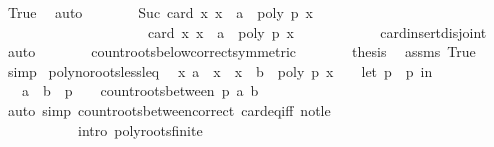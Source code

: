 \begin{isabellebody}
\ True\ \isamarkupfalse%
\ auto\isanewline
\ \ \ \ \isamarkupfalse%
\ \isamarkupfalse%
\ {\isachardoublequoteopen}Suc\ {\isacharparenleft}card\ {\isacharbraceleft}x{\isachardot}\ x\ {\isacharless}\ a\ {\isasymand}\ poly\ p\ x\ {\isacharequal}\ {}{\isacharbraceright}{\isacharparenright}\ {\isacharequal}\isanewline
\ \ \ \ \ \ \ \ \ \ \ \ \ \ \ \ \ \ \ \ \ {\isacharparenleft}card\ {\isacharbraceleft}x{\isachardot}\ x\ {\isasymle}\ a\ {\isasymand}\ poly\ p\ x\ {\isacharequal}\ {}{\isacharbraceright}{\isacharparenright}{\isachardoublequoteclose}\isanewline
\ \ \ \ \ \ \ \ \isamarkupfalse%
\ card{\isacharunderscore}insert{\isacharunderscore}disjoint\ \isamarkupfalse%
\ auto\isanewline
\ \ \ \ \isamarkupfalse%
\ \isamarkupfalse%
\ count{\isacharunderscore}roots{\isacharunderscore}below{\isacharunderscore}correct{\isacharbrackleft}symmetric{\isacharbrackright}\isanewline
\ \ \ \ \isamarkupfalse%
\ \isamarkupfalse%
\ {\isacharquery}thesis\ \isamarkupfalse%
\ assms\ True\ \isamarkupfalse%
\ simp\isanewline
{}\isamarkupfalse%
%
\endisatagproof
{\isafoldproof}%
%
\isadelimproof
\isanewline
%
\endisadelimproof
\isanewline
\isanewline
{}\isamarkupfalse%
\ poly{\isacharunderscore}no{\isacharunderscore}roots{\isacharunderscore}less{\isacharunderscore}leq{\isacharcolon}\isanewline
\ \ {\isachardoublequoteopen}{\isacharparenleft}{\isasymforall}x{\isachardot}\ a\ {\isacharless}\ x\ {\isasymand}\ x\ {\isasymle}\ b\ {\isasymlongrightarrow}\ poly\ p\ x\ {\isasymnoteq}\ {}{\isacharparenright}\ {\isasymlongleftrightarrow}\ {\isacharparenleft}let\ p\ {\isacharequal}\ p\ in\isanewline
\ \ \ {\isacharparenleft}a\ {\isasymge}\ b\ {\isasymor}\ {\isacharparenleft}p\ {\isasymnoteq}\ {}\ {\isasymand}\ count{\isacharunderscore}roots{\isacharunderscore}between\ p\ a\ b\ {\isacharequal}\ {}{\isacharparenright}{\isacharparenright}{\isacharparenright}{\isachardoublequoteclose}\isanewline
%
\isadelimproof
\ \ %
\endisadelimproof
%
\isatagproof
{}\isamarkupfalse%
\ {\isacharparenleft}auto\ simp{\isacharcolon}\ count{\isacharunderscore}roots{\isacharunderscore}between{\isacharunderscore}correct\ card{\isacharunderscore}eq{\isacharunderscore}{}{\isacharunderscore}iff\ not{\isacharunderscore}le\ \isanewline
\ \ \ \ \ \ \ \ \ \ \ intro{\isacharcolon}\ poly{\isacharunderscore}roots{\isacharunderscore}finite{\isacharparenright}%

\end{isabellebody}
